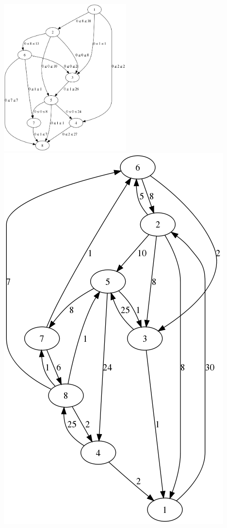  \includegraphics[width=0.5\textwidth]{img/4-graph.png}
  \includegraphics[height=0.6\textwidth]{img/4-res-graph.png}
  
